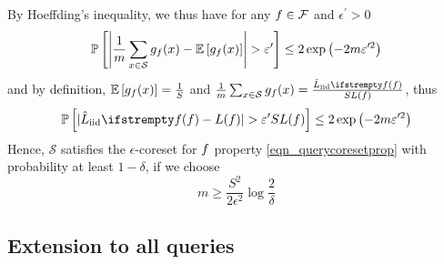 By Hoeffding's inequality, we thus have for any $f \in \mathcal{F}$ and $\epsilon^{\prime}>0$
\begin{equation}
	\mathbb{P}\left[\left|\frac{1}{m} \sum_{x \in \mathcal{S}} g_{\query}(x) - \mathbb{E}\left[g_{\query}(x)\right]\right|>\epsilon^{\prime}\right] \leq 2 \exp \left(-2 m \epsilon^{\prime 2}\right)
\end{equation}
and by definition, $\mathbb{E}\left[g_{f}(x)\right]=\frac{1}{S}$ and $\frac{1}{m} \sum_{x \in \mathcal{S}} g_{\query}(x)=\frac{\estloss{\textrm{iid}}{\query}}{S L(\query)}$, thus
\begin{equation*}
	\mathbb{P}\left[|\estloss{\textrm{iid}}{\query} - L(\query)|>\epsilon^{\prime} S L(\query)\right] \leq 2 \exp \left(-2 m \epsilon^{\prime 2}\right)
\end{equation*}
Hence, $\mathcal{S}$ satisfies the $\epsilon$-coreset for $f$ property \ref{eqn_querycoresetprop} with probability at least $1-\delta$, if we choose
\begin{equation}
	m \geq \frac{S^{2}}{2 \epsilon^{2}} \log \frac{2}{\delta}
\end{equation}


\subsection{Extension to all queries}



